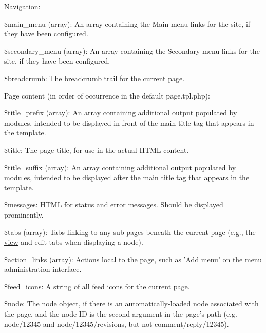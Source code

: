 Navigation:
\begin{DoxyItemize}
\item \$main\_\-menu (array): An array containing the Main menu links for the site, if they have been configured.
\item \$secondary\_\-menu (array): An array containing the Secondary menu links for the site, if they have been configured.
\item \$breadcrumb: The breadcrumb trail for the current page.
\end{DoxyItemize}

Page content (in order of occurrence in the default page.tpl.php):
\begin{DoxyItemize}
\item \$title\_\-prefix (array): An array containing additional output populated by modules, intended to be displayed in front of the main title tag that appears in the template.
\item \$title: The page title, for use in the actual HTML content.
\item \$title\_\-suffix (array): An array containing additional output populated by modules, intended to be displayed after the main title tag that appears in the template.
\item \$messages: HTML for status and error messages. Should be displayed prominently.
\item \$tabs (array): Tabs linking to any sub-\/pages beneath the current page (e.g., the \hyperlink{classview}{view} and edit tabs when displaying a node).
\item \$action\_\-links (array): Actions local to the page, such as 'Add menu' on the menu administration interface.
\item \$feed\_\-icons: A string of all feed icons for the current page.
\item \$node: The node object, if there is an automatically-\/loaded node associated with the page, and the node ID is the second argument in the page's path (e.g. node/12345 and node/12345/revisions, but not comment/reply/12345).
\end{DoxyItemize}

